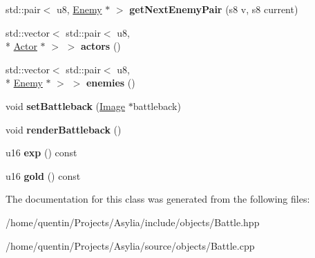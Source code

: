 \begin{DoxyCompactItemize}
\item 
\hypertarget{classBattle_afc4572d8a6760d86347d798f98f29835}{std\-::pair$<$ u8, \hyperlink{classEnemy}{Enemy} $\ast$ $>$ {\bfseries get\-Next\-Enemy\-Pair} (s8 v, s8 current)}\label{classBattle_afc4572d8a6760d86347d798f98f29835}

\item 
\hypertarget{classBattle_acd364ba3f1f746928d7fba884d3a786a}{std\-::vector$<$ std\-::pair$<$ u8, \\*
\hyperlink{classActor}{Actor} $\ast$ $>$ $>$ {\bfseries actors} ()}\label{classBattle_acd364ba3f1f746928d7fba884d3a786a}

\item 
\hypertarget{classBattle_a8c7186d9e2b051c3e35aa4af6335bd98}{std\-::vector$<$ std\-::pair$<$ u8, \\*
\hyperlink{classEnemy}{Enemy} $\ast$ $>$ $>$ {\bfseries enemies} ()}\label{classBattle_a8c7186d9e2b051c3e35aa4af6335bd98}

\item 
\hypertarget{classBattle_ae1b334af1ccf83fb7cba4b00de66962b}{void {\bfseries set\-Battleback} (\hyperlink{classImage}{Image} $\ast$battleback)}\label{classBattle_ae1b334af1ccf83fb7cba4b00de66962b}

\item 
\hypertarget{classBattle_a6e4983c56bd308a7b220fd65a27df3c3}{void {\bfseries render\-Battleback} ()}\label{classBattle_a6e4983c56bd308a7b220fd65a27df3c3}

\item 
\hypertarget{classBattle_a2d70234e3d13c2eb389afde028f93dc8}{u16 {\bfseries exp} () const }\label{classBattle_a2d70234e3d13c2eb389afde028f93dc8}

\item 
\hypertarget{classBattle_adb2b58224ab058e7335a244d5938c192}{u16 {\bfseries gold} () const }\label{classBattle_adb2b58224ab058e7335a244d5938c192}

\end{DoxyCompactItemize}


The documentation for this class was generated from the following files\-:\begin{DoxyCompactItemize}
\item 
/home/quentin/\-Projects/\-Asylia/include/objects/Battle.\-hpp\item 
/home/quentin/\-Projects/\-Asylia/source/objects/Battle.\-cpp\end{DoxyCompactItemize}
